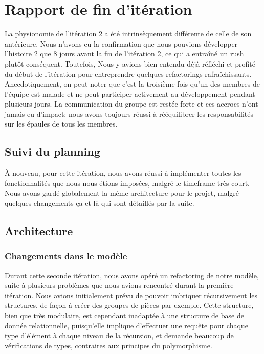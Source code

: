 \section{Rapport de fin d'itération}

La physionomie de l'itération 2 a été intrinsèquement différente de celle de son 
antérieure. Nous n'avons eu la confirmation que nous pouvions développer
l'histoire 2 que 8 jours avant la fin de l'itération 2, ce qui a entraîné un 
rush plutôt conséquent. Toutefois, Nous y avions bien entendu déjà réfléchi et 
profité du début de l'itération pour entreprendre quelques refactorings 
rafraîchissants.\\

Anecdotiquement, on peut noter que c'est la troisième fois qu'un des membres de
l'équipe est malade et ne peut participer activement au développement pendant
plusieurs jours. La communication du groupe est restée forte et ces accrocs 
n'ont jamais eu d'impact; nous avons toujours réussi à rééquilibrer les 
responsabilités sur les épaules de tous les membres.

\subsection{Suivi du planning}
À nouveau, pour cette itération, nous avons réussi à implémenter toutes les 
fonctionnalités que nous nous étions imposées, malgré le timeframe très court.\\

Nous avons gardé globalement la même architecture pour le projet, malgré 
quelques changements ça et là qui sont détaillés par la suite.

\subsection{Architecture}
	
	\subsubsection{Changements dans le modèle}
	Durant cette seconde itération, nous avons opéré un refactoring de notre modèle, suite à plusieurs problèmes que nous avions rencontré durant la première itération. Nous avions initialement prévu de pouvoir imbriquer récursivement les structures, de façon à créer des groupes de pièces par exemple. Cette structure, bien que très modulaire, est cependant inadaptée à une structure de base de donnée relationnelle, puisqu'elle implique d'effectuer une requête pour chaque type d'élément à chaque niveau de la récursion, et demande beaucoup de vérifications de types, contraires aux principes du polymorphisme.

